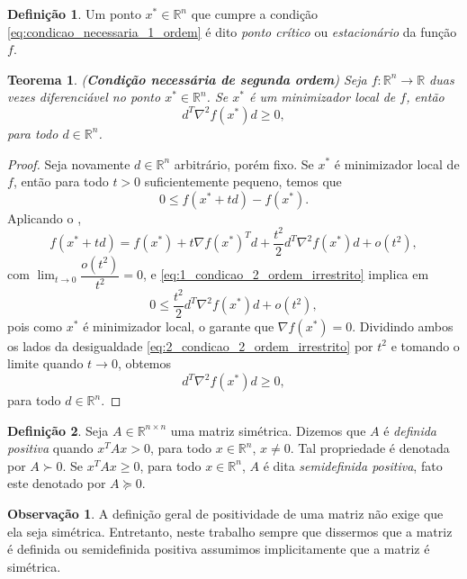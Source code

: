 \documentclass[12pt,a4paper]{scrartcl}
\def\RR{\mathds{R}}
\newtheorem{teo}{Teorema}
\theoremstyle{definition}%
\newtheorem{defi}{Definição}
\newtheorem{obs}{Observação}
\begin{document}
\begin{defi}\label{defi:ponto_critico}
Um ponto $x^{*} \in \RR^{n}$ que cumpre a condição \eqref{eq:condicao_necessaria_1_ordem} é dito \emph{ponto crítico} ou \emph{estacionário} da função $f$. 
\end{defi}


\begin{teo}(\textbf{Condição necessária de segunda ordem}) \label{teo:condicao_necessaria_2_ordem}
Seja $f:\RR^{n} \rightarrow \RR$ duas vezes diferenciável no ponto $x^{*} \in \RR^{n}$. Se $x^{*}$ é um minimizador local de $f$, então 
\[
d^{T} \nabla^{2} f(x^{*})d \geq 0,
\]
para todo $d \in \RR^{n}$.
\end{teo}
\begin{proof}
Seja novamente $d\in \RR^{n}$ arbitrário, porém fixo. Se $x^{*}$ é minimizador local de $f$, então para todo $t>0$ suficientemente pequeno, temos que
\[\label{eq:1_condicao_2_ordem_irrestrito}
0 \leq f(x^{*}+td) - f(x^{*}).
\]
Aplicando o ,
\[
f(x^{*}+td) = f(x^{*}) + t\nabla f(x^{*})^{T}d + \dfrac{t^{2}}{2} d^{T}\nabla^{2} f(x^{*})d + o(t^{2}),
\]
com $\displaystyle\lim_{t\rightarrow 0} \dfrac{o(t^{2})}{t^{2}} =0$, e  \eqref{eq:1_condicao_2_ordem_irrestrito} implica em
\[ \label{eq:2_condicao_2_ordem_irrestrito}
0 \leq \dfrac{t^{2}}{2} d^{T}\nabla^{2} f(x^{*})d + o(t^{2}),
\]
 pois como $x^{*}$ é minimizador local, o  garante que $\nabla f(x^{*}) =0$. Dividindo ambos os lados da desigualdade \eqref{eq:2_condicao_2_ordem_irrestrito} por $t^{2}$ e tomando o limite quando $t\rightarrow 0$, obtemos
\[
d^{T} \nabla^{2} f(x^{*})d \geq 0,
\]
para todo $d \in \RR^{n}$.
\end{proof}

\begin{defi} \label{defi:definida_positiva}
Seja $A \in \RR^{n\times n}$ uma matriz simétrica. Dizemos que $A$ é \emph{definida positiva} quando $x^{T}Ax >0$, para todo $x\in \RR^{n}$, $x \neq 0$. Tal propriedade é denotada por $A \succ 0$. Se $x^{T}Ax \geq 0$, para todo $x\in \RR^{n}$, $A$ é dita \emph{semidefinida positiva}, fato este denotado por $A \succcurlyeq 0$.
\end{defi}
\begin{obs}
A definição geral de positividade de uma matriz não exige que ela seja simétrica. Entretanto, neste trabalho sempre que dissermos que a matriz é definida ou semidefinida positiva assumimos implicitamente que a matriz é simétrica.
\end{obs}
\end{document}
